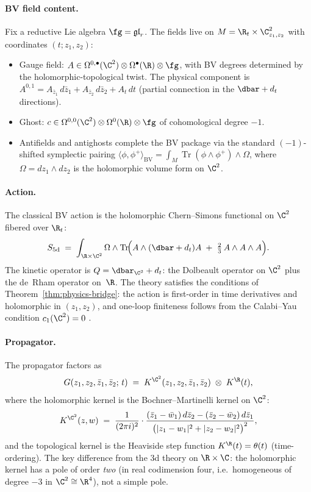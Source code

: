 \paragraph{BV field content.}
Fix a reductive Lie algebra $\fg = \mathfrak{gl}_r$. The
fields live on $M = \R_t \times \C^2_{z_1,z_2}$ with
coordinates $(t; z_1, z_2)$:
\begin{itemize}[nosep]
\item Gauge field:
 $A \in \Omega^{0,\bullet}(\C^2) \otimes
 \Omega^\bullet(\R) \otimes \fg$,
 with BV degrees determined by the holomorphic-topological
 twist. The physical component is
 $A^{0,1} = A_{\bar z_1}\,d\bar z_1 +
 A_{\bar z_2}\,d\bar z_2 + A_t\,dt$
 (partial connection in the $\dbar + d_t$ directions).
\item Ghost: $c \in \Omega^{0,0}(\C^2)\otimes\Omega^0(\R)
 \otimes \fg$ of cohomological degree $-1$.
\item Antifields and antighosts complete the BV package
 via the standard $(-1)$-shifted symplectic pairing
 $\langle \phi, \phi^+ \rangle_{\mathrm{BV}} =
 \int_M \operatorname{Tr}(\phi \wedge \phi^+)
 \wedge \Omega$,
 where $\Omega = dz_1 \wedge dz_2$ is the holomorphic
 volume form on $\C^2$.
\end{itemize}

\paragraph{Action.}
The classical BV action is the holomorphic Chern--Simons
functional on $\C^2$ fibered over $\R_t$:
\begin{equation}\label{eq:5d-HT-action}
 S_{\mathrm{5d}}
 \;=\;
 \int_{\R\times\C^2}
 \Omega \wedge
 \operatorname{Tr}\!\Bigl(
 A \wedge (\dbar + d_t) A
 \;+\; \tfrac{2}{3}\, A \wedge A \wedge A
 \Bigr).
\end{equation}
The kinetic operator is $Q = \dbar_{\C^2} + d_t$: the
Dolbeault operator on $\C^2$ plus the de~Rham operator
on~$\R$. The theory satisfies the conditions of
Theorem~\ref{thm:physics-bridge}: the action is
first-order in time derivatives and holomorphic in
$(z_1,z_2)$, and one-loop finiteness follows from the
Calabi--Yau condition $c_1(\C^2) = 0$
\cite{costello-renormalization}.

\paragraph{Propagator.}
The propagator factors as
\begin{equation}\label{eq:5d-propagator}
 G(z_1,z_2,\bar z_1,\bar z_2;\, t)
 \;=\;
 K^{\C^2}(z_1,z_2,\bar z_1,\bar z_2)
 \;\otimes\;
 K^{\R}(t),
\end{equation}
where the holomorphic kernel is the Bochner--Martinelli
kernel on $\C^2$:
\[
 K^{\C^2}(z,w)
 \;=\;
 \frac{1}{(2\pi i)^2}
 \cdot
 \frac{(\bar z_1 - \bar w_1)\,d\bar z_2
 - (\bar z_2 - \bar w_2)\,d\bar z_1}
 {\bigl(|z_1-w_1|^2 + |z_2-w_2|^2\bigr)^2},
\]
and the topological kernel is the Heaviside step function
$K^{\R}(t) = \theta(t)$ (time-ordering). The key
difference from the 3d theory on $\R \times \C$: the
holomorphic kernel has a pole of order \emph{two}
(in real codimension four, i.e.\
homogeneous of degree $-3$ in $\C^2 \cong \R^4$),
not a simple pole.

